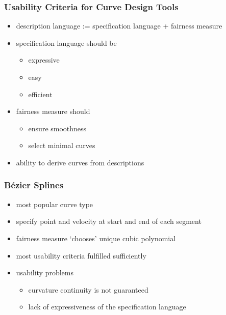 \documentclass[mathserif]{beamer}
\begin{document}
		\begin{frame}
			\frametitle{Usability Criteria for Curve Design Tools}
			\begin{itemize}
				\item description language := specification language + fairness measure
				\item specification language should be
				\begin{itemize}
					\item expressive
					\item easy
					\item efficient
				\end{itemize}
				\item fairness measure should
				\begin{itemize}
					\item ensure smoothness
					\item select minimal curves
				\end{itemize}
				\item ability to derive curves from descriptions
			\end{itemize}
		\end{frame}

		\begin{frame}
			\frametitle{Bézier Splines}
			\begin{itemize}
				\item most popular curve type
				\item specify point and velocity at start and end of each segment
				\item fairness measure `chooses' unique cubic polynomial
				\item most usability criteria fulfilled sufficiently
				\item usability problems
				\begin{itemize}
					\item curvature continuity is not guaranteed
					\item lack of expressiveness of the specification language
				\end{itemize}
			\end{itemize}
		\end{frame}
\end{document}
